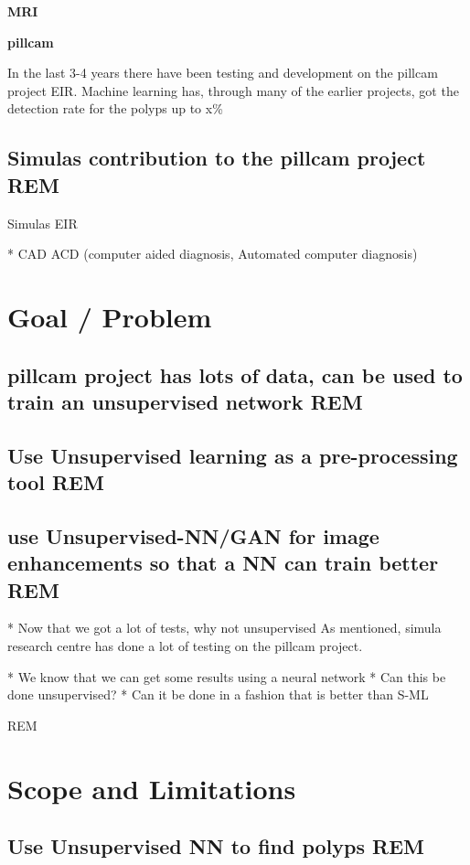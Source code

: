 	\vspace{10px}
	\textbf{MRI}
	
	\vspace{10px}
	\textbf{pillcam}
	
	In the last 3-4 years there have been testing and development on the pillcam project EIR. Machine learning has, through 
	many of the earlier projects, got the detection rate for the polyps up to x\% %
	
	
	\vspace{10px}
	\subsection{Simulas contribution to the pillcam project REM}
	Simulas EIR
		

		
	* CAD ACD (computer aided diagnosis, Automated computer diagnosis)
	
	\section{Goal / Problem}
		\subsection{pillcam project has lots of data, can be used to train an unsupervised network REM}
		\subsection{Use Unsupervised learning as a pre-processing tool REM}
		\subsection{use Unsupervised-NN/GAN for image enhancements so that a NN can train better REM}
		* Now that we got a lot of tests, why not unsupervised
		As mentioned, simula research centre has done a lot of testing on the pillcam project.
		  
		* We know that we can get some results using a neural network
		* Can this be done unsupervised?
		* Can it be done in a fashion that is better than S-ML
		 
		 REM

		
	\section{Scope and Limitations}
		\subsection{Use Unsupervised NN to find polyps REM}
